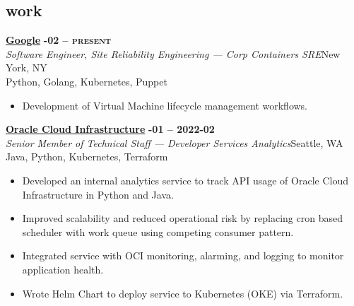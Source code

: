 \documentclass[margin,10pt]{res}
\begin{document}
\begin{resume}
\section{\sc \lsstyle work}
    \href{https://www.google.com/}{\textbf{Google}} \hfill \textsc{\bfseries{}-02 -- present}\\
    \textit{Software Engineer, Site Reliability Engineering --- Corp Containers SRE}\hfill New York, NY\\
    Python, Golang, Kubernetes, Puppet
    \begin{itemize}
        \item Development of Virtual Machine lifecycle management workflows.
    \end{itemize}

    \href{https://www.oracle.com/cloud/}{\textbf{Oracle Cloud Infrastructure}} \hfill \textsc{\bfseries{}-01 -- 2022-02}\\
    \textit{Senior Member of Technical Staff --- Developer Services Analytics}\hfill Seattle, WA\\
    Java, Python, Kubernetes, Terraform
    \begin{itemize}
        \item Developed an internal analytics service to track API usage of Oracle Cloud Infrastructure in Python and Java.
        \item Improved scalability and reduced operational risk by replacing cron based scheduler with work queue using competing
        consumer pattern.
        \item Integrated service with OCI monitoring, alarming, and logging to monitor application health.
        \item Wrote Helm Chart to deploy service to Kubernetes (OKE) via Terraform.
    \end{itemize}


\end{resume}
\end{document}
